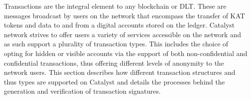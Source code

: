 Transactions are the integral element to any blockchain or DLT. These are messages broadcast by users on the network that encompass the transfer of KAT tokens and data to and from a digital accounts stored on the ledger. Catalyst network strives to offer users a variety of services accessible on the network and as such support a plurality of transaction types. This includes the choice of opting for hidden or visible accounts via the support of both non-confidential and confidential transactions, thus offering different levels of anonymity to the network users. This section describes how different transaction structures and thus types are supported on Catalyst and details the processes behind the generation and verification of transaction signatures. 